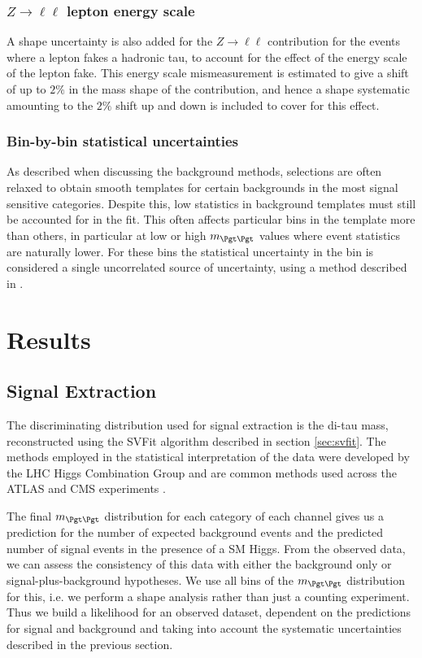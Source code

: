 \subsubsection{\textbf{$Z \to \ell\ell$ lepton energy scale}}
A shape uncertainty is also added for the $Z \to \ell\ell$ contribution for the
events where a lepton fakes a hadronic tau, to account for the effect of the energy 
scale of the lepton fake. This energy scale mismeasurement is estimated to give a 
shift of up to $2\%$ in the mass shape of the contribution, and hence a shape systematic amounting to the
$2\%$ shift up and down is included to cover for this effect.

\subsubsection{\textbf{Bin-by-bin statistical uncertainties}}
As described when discussing the background methods, selections are often
relaxed to obtain smooth templates for certain backgrounds in the most signal
sensitive categories. Despite this, low statistics in background templates must
still be accounted for in the fit. This often affects particular bins in the
template more than others, in particular at low or high $m_{\Pgt\Pgt}$ values
where event statistics are naturally lower. For these bins the statistical
uncertainty in the bin is considered a single uncorrelated source of
uncertainty, using a method described in \cite{Barlow1993219}. 

\section{Results}
\label{sec:results}

\subsection{Signal Extraction}
\label{sec:signalextraction}

The discriminating distribution used for signal extraction is the di-tau mass,
reconstructed using the SVFit algorithm described in section \ref{sec:svfit}. 
The methods employed in the statistical
interpretation of the data were developed by the LHC Higgs Combination Group and
are common methods used across the ATLAS and CMS experiments \cite{LHC-HCG-Report}.

The final $m_{\Pgt\Pgt}$ distribution for each category of each channel gives
us a prediction for the number of expected background events and the predicted number of signal
events in the presence of a \ac{SM} Higgs. From the observed data, we can assess
the consistency of this data with either the background only or
signal-plus-background hypotheses. We use all bins of the $m_{\Pgt\Pgt}$
distribution for this, i.e. we perform a shape analysis rather than just a
counting experiment. Thus we build a likelihood for an observed dataset,
dependent on the predictions for signal and background and taking into account
the systematic uncertainties described in the previous section.

